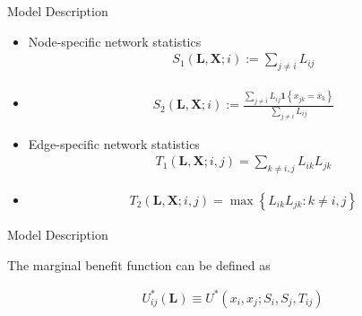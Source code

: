 \documentclass{beamer}		%
\begin{document}
\begin{frame}{Model Description}

\begin{itemize}
    \item Node-specific network statistics
    \begin{align}
        S_1(\bm{L}, \bm{X};i) := \sum_{j \ne i} L_{ij}
    \end{align}
    
    \item 
    \begin{align}
        S_2(\bm{L}, \bm{X};i) := \frac{\sum_{j \ne i} L_{ij} \bm{1} \left\{ x_{jk} = \bar{x}_k \right\}}{\sum_{j \ne i} L_{ij}}
    \end{align}
    \pause
    
    \item Edge-specific network statistics
    \begin{align}
        T_1(\bm{L}, \bm{X};i,j) = \sum_{k \ne i,j} L_{ik} L_{jk}
    \end{align}
    
    \item 
    \begin{align}
        T_2(\bm{L}, \bm{X};i,j) = \max \left\{ L_{ik} L_{jk} : k \ne i,j \right\}
    \end{align}
        
    
\end{itemize}


    
\end{frame}










\begin{frame}{Model Description}

The marginal benefit function can be defined as

\begin{align}
    U_{ij}^*(\bm{L}) \equiv U^*(x_i, x_j; S_i, S_j, T_{ij})
\end{align}

\end{frame}
\end{document}
